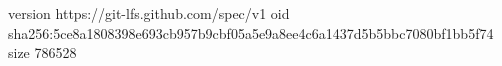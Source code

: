 version https://git-lfs.github.com/spec/v1
oid sha256:5ce8a1808398e693cb957b9cbf05a5e9a8ee4c6a1437d5b5bbc7080bf1bb5f74
size 786528
